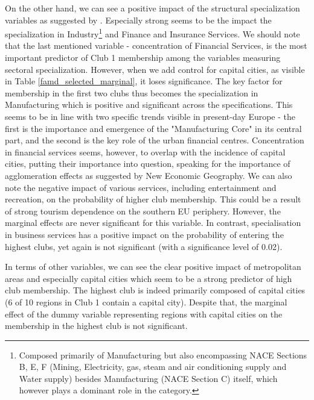 \documentclass[11pt]{article}
\begin{document}
On the other hand, we can see a positive impact of the structural specialization variables as suggested by \citet{cutrini2019economic}. Especially strong seems to be the impact the specialization in Industry\footnote{Composed primarily of Manufacturing but also encompassing NACE Sections B, E, F (Mining, Electricity, gas, steam and air conditioning supply and Water supply) besides Manufacturing (NACE Section C) itself, which however plays a dominant role in the category.} and Finance and Insurance Services. We should note that the last mentioned variable - concentration of Financial Services, is the most important predictor of Club 1 membership among the variables measuring sectoral specialization. However, when we add control for capital cities, as visible in Table \ref{famd_selected_marginal}, it loses significance. The key factor for membership in the first two clubs thus becomes the specialization in Manufacturing which is positive and significant across the specifications. This seems to be in line with two specific trends visible in present-day Europe - the first is the importance and emergence of the "Manufacturing Core" in its central part, and the second is the key role of the urban financial centres. Concentration in financial services seems, however, to overlap with the incidence of capital cities, putting their importance into question, speaking for the importance of agglomeration effects as suggested by New Economic Geography.
We can also note the negative impact of various services, including entertainment and recreation, on the probability of higher club membership. This could be a result of strong tourism dependence on the southern EU periphery. However, the marginal effects are never significant for this variable. In contrast, specialisation in business services has a positive impact on the probability of entering the highest clubs, yet again is not significant (with a significance level of 0.02).

In terms of other variables, we can see the clear positive impact of metropolitan areas and especially capital cities which seem to be a strong predictor of high club membership. The highest club is indeed primarily composed of capital cities (6 of 10 regions in Club 1 contain a capital city). Despite that, the marginal effect of the dummy variable representing regions with capital cities on the membership in the highest club is not significant.
\end{document}
